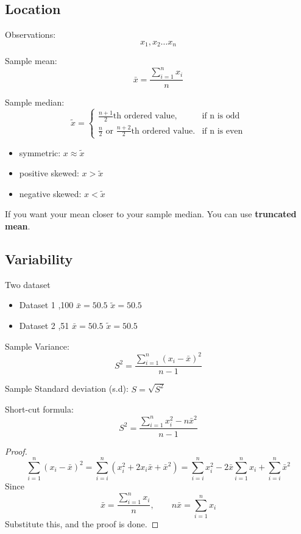 \subsection{Location}

Observations: \[x_1,x_2 \dots x_n\]

Sample mean:
\[\bar{x}=\frac{\sum_{i=1}^{n} x_i}{n}\]

Sample median:
\[
\tilde{x}=\begin{cases}
\frac{n+1}{2}\text{th ordered value}, &\text{if n is odd}\\
\frac{n}{2}\text{ or }\frac{n+2}{2}\text{th ordered value}. &\text{if n is even}
\end{cases}\]


\begin{itemize}
  \item symmetric: $x\approx \tilde{x}$
  \item positive skewed: $x>\tilde{x}$
  \item negative skewed: $x<\tilde{x}$
\end{itemize}

If you want your mean closer to your sample median. You can use \textbf{truncated mean}.


\subsection{Variability}
\begin{exmp}
Two dataset
  \begin{itemize}
    \item Dataset 1 ,100 \qquad  $\bar{x}=50.5$ \qquad $\tilde{x}=50.5$
    \item Dataset 2 ,51 \qquad  $\bar{x}=50.5$ \qquad $\tilde{x}=50.5$
  \end{itemize}
\end{exmp}


\vspace{4mm}
Sample Variance: \[S^2=\frac{\sum_{i=1}^{n} (x_i-\bar{x})^2}{n-1}\]

Sample Standard deviation (s.d): $S=\sqrt{S^2}$

\vspace{4mm}

Short-cut formula:
\[S^2=\frac{{\sum_{i=1}^{n} x_i^2} - n{\bar{x}}^2}{n-1}
\]
\begin{proof}
\[\sum_{i=1}^{n}(x_i-\bar{x})^2=
\sum_{i=i}^{n}(x_i^2+2x_i\bar{x}+{\bar{x}}^2)=
\sum_{i=i}^{n}x_i^2-2\bar{x}\sum_{i=1}^{n}x_i+
\sum_{i=i}^{n}\bar{x}^2 \]
Since \[\bar{x}=\frac{\sum_{i=1}^{n} x_i}{n}, \qquad n\bar{x}=\sum_{i=1}^{n} x_i \]
Substitute this, and the proof is done. 
\end{proof}

